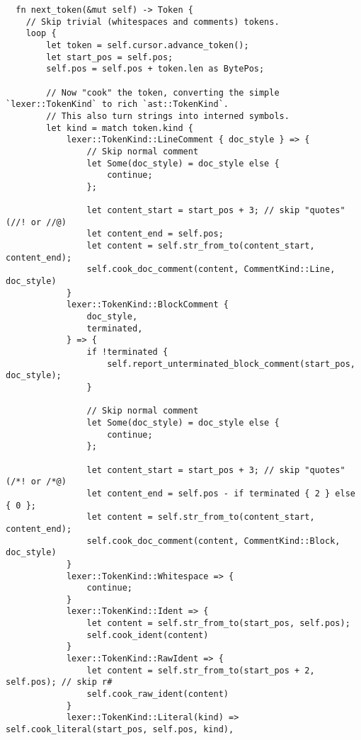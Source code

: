 \begin{lstlisting}
  fn next_token(&mut self) -> Token {
    // Skip trivial (whitespaces and comments) tokens.
    loop {
        let token = self.cursor.advance_token();
        let start_pos = self.pos;
        self.pos = self.pos + token.len as BytePos;

        // Now "cook" the token, converting the simple `lexer::TokenKind` to rich `ast::TokenKind`.
        // This also turn strings into interned symbols.
        let kind = match token.kind {
            lexer::TokenKind::LineComment { doc_style } => {
                // Skip normal comment
                let Some(doc_style) = doc_style else {
                    continue;
                };

                let content_start = start_pos + 3; // skip "quotes" (//! or //@)
                let content_end = self.pos;
                let content = self.str_from_to(content_start, content_end);
                self.cook_doc_comment(content, CommentKind::Line, doc_style)
            }
            lexer::TokenKind::BlockComment {
                doc_style,
                terminated,
            } => {
                if !terminated {
                    self.report_unterminated_block_comment(start_pos, doc_style);
                }

                // Skip normal comment
                let Some(doc_style) = doc_style else {
                    continue;
                };

                let content_start = start_pos + 3; // skip "quotes" (/*! or /*@)
                let content_end = self.pos - if terminated { 2 } else { 0 };
                let content = self.str_from_to(content_start, content_end);
                self.cook_doc_comment(content, CommentKind::Block, doc_style)
            }
            lexer::TokenKind::Whitespace => {
                continue;
            }
            lexer::TokenKind::Ident => {
                let content = self.str_from_to(start_pos, self.pos);
                self.cook_ident(content)
            }
            lexer::TokenKind::RawIdent => {
                let content = self.str_from_to(start_pos + 2, self.pos); // skip r#
                self.cook_raw_ident(content)
            }
            lexer::TokenKind::Literal(kind) => self.cook_literal(start_pos, self.pos, kind),


\end{lstlisting}
